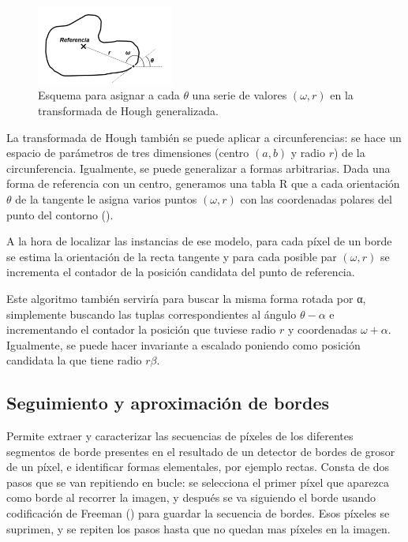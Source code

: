 \documentclass[nochap,palatino]{apuntes}
\begin{document}
\begin{figure}
\centering
\includegraphics[width=0.4\textwidth]{img/HoughGeneral.png}
\caption{Esquema para asignar a cada $θ$ una serie de valores $(ω,r)$ en la transformada de Hough generalizada.}
\label{fig:HoughGeneral}
\end{figure}

La transformada de Hough también se puede aplicar a circunferencias: se hace un espacio de parámetros de tres dimensiones (centro $(a,b)$ y radio $r$) de la circunferencia. Igualmente, se puede generalizar a formas arbitrarias. Dada una forma de referencia con un centro, generamos una tabla R que a cada orientación $θ$ de la tangente le asigna varios puntos $(ω,r)$ con las coordenadas polares del punto del contorno ().

A la hora de localizar las instancias de ese modelo, para cada píxel de un borde se estima la orientación de la recta tangente y para cada posible par $(ω,r)$ se incrementa el contador de la posición candidata del punto de referencia.

Este algoritmo también serviría para buscar la misma forma rotada por α, simplemente buscando las tuplas correspondientes al ángulo $θ-α$ e incrementando el contador la posición que tuviese radio $r$ y coordenadas $ω + α$. Igualmente, se puede hacer invariante a escalado poniendo como posición candidata la que tiene radio $rβ$.

\subsection{Seguimiento y aproximación de bordes}

Permite extraer y caracterizar las secuencias de píxeles de los diferentes segmentos de borde presentes en el resultado de un detector de bordes de grosor de un píxel, e identificar formas elementales, por ejemplo rectas. Consta de dos pasos que se van repitiendo en bucle: se selecciona el primer píxel que aparezca como borde al recorrer la imagen, y después se va siguiendo el borde usando codificación de Freeman () para guardar la secuencia de bordes. Esos píxeles se suprimen, y se repiten los pasos hasta que no quedan mas píxeles en la imagen.
\end{document}
